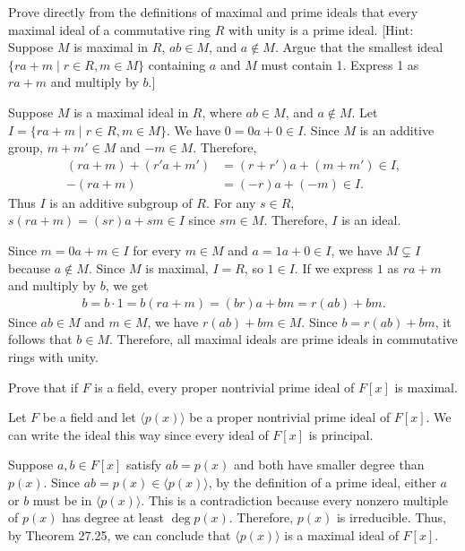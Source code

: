 \documentclass[11pt]{article}
\begin{document}
\begin{problem}[27.28]
    Prove directly from the definitions of maximal and prime ideals that every maximal ideal of a commutative ring $R$ with unity is a prime ideal. [Hint: Suppose $M$ is maximal in $R$, $ab \in M$, and $a \not\in M$. Argue that the smallest ideal $\{ra + m \mid r \in R, m \in M\}$ containing $a$ and $M$ must contain 1. Express 1 as $ra + m$ and multiply by $b$.]
\end{problem}
\begin{solution}
    Suppose $M$ is a maximal ideal in $R$, where $ab \in M$, and $a \not\in M$.
    Let $I = \{ra + m \mid r \in R, m \in M\}$.
    We have $0 = 0a + 0 \in I$. Since $M$ is an additive group,
    $m + m' \in M$ and $-m \in M$. Therefore,
    \begin{align*}
        (ra + m) + (r'a + m') &= (r + r')a + (m + m') \in I,\\
        -(ra + m) &= (-r)a + (-m) \in I.
    \end{align*}
    Thus $I$ is an additive subgroup of $R$. For any $s \in R$,
    $s(ra + m) = (sr)a + sm \in I$ since $sm \in M$.
    Therefore, $I$ is an ideal.

    Since $m = 0a + m \in I$ for every $m \in M$ and
    $a = 1a + 0 \in I$, we have $M \subsetneq I$ because
    $a \not\in M$. Since $M$ is maximal, $I = R$, so $1 \in I$.
    If we express $1$ as $ra + m$ and multiply by $b$, we get
    \begin{align*}
        b = b \cdot 1 = b(ra + m) = (br)a + bm = r(ab) + bm.
    \end{align*}
    Since $ab \in M$ and $m \in M$, we have $r(ab) + bm \in M$.
    Since $b = r(ab) + bm$, it follows that $b \in M$.
    Therefore, all maximal ideals are prime ideals in commutative rings with unity.
\end{solution}
\begin{problem}[27.30]
    Prove that if $F$ is a field, every proper nontrivial prime ideal of $F[x]$ is maximal.
\end{problem}
\begin{solution}
    Let $F$ be a field and let $\langle p(x)\rangle$ be a proper nontrivial prime ideal of $F[x]$. We can write the ideal this way since every ideal of $F[x]$ is principal.

    Suppose $a,b \in F[x]$ satisfy $ab = p(x)$ and both have smaller degree than $p(x)$. Since $ab = p(x) \in \langle p(x)\rangle$, by the definition of a prime ideal, either $a$ or $b$ must be in $\langle p(x)\rangle$. This is a contradiction because every nonzero multiple of $p(x)$ has degree at least $\deg p(x)$. Therefore, $p(x)$ is irreducible. Thus, by Theorem 27.25, we can conclude that $\langle p(x)\rangle$ is a maximal ideal of $F[x]$.
\end{solution}
\end{document}
